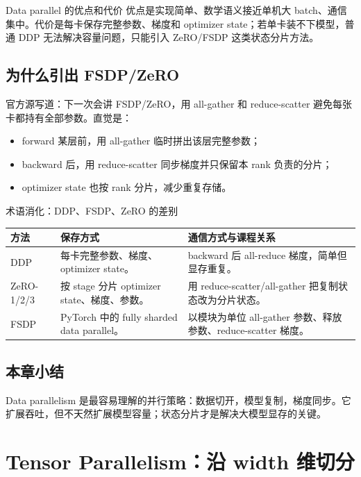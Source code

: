 \documentclass[a4paper]{article}
\begin{document}
\begin{importantbox}{Data parallel 的优点和代价}
优点是实现简单、数学语义接近单机大 batch、通信集中。代价是每卡保存完整参数、梯度和 optimizer state；若单卡装不下模型，普通 DDP 无法解决容量问题，只能引入 ZeRO/FSDP 这类状态分片方法。
\end{importantbox}

\subsection{为什么引出 FSDP/ZeRO}

官方源写道：下一次会讲 FSDP/ZeRO，用 all-gather 和 reduce-scatter 避免每张卡都持有全部参数。直觉是：

\begin{itemize}
    \item forward 某层前，用 all-gather 临时拼出该层完整参数；
    \item backward 后，用 reduce-scatter 同步梯度并只保留本 rank 负责的分片；
    \item optimizer state 也按 rank 分片，减少重复存储。
\end{itemize}

\begin{knowledgebox}{术语消化：DDP、FSDP、ZeRO 的差别}
\begin{tabular}{L{0.18\textwidth}L{0.32\textwidth}L{0.4\textwidth}}
\toprule
方法 & 保存方式 & 通信方式与课程关系 \\
\midrule
DDP & 每卡完整参数、梯度、optimizer state。 & backward 后 all-reduce 梯度，简单但显存重复。 \\
ZeRO-1/2/3 & 按 stage 分片 optimizer state、梯度、参数。 & 用 reduce-scatter/all-gather 把复制状态改为分片状态。 \\
FSDP & PyTorch 中的 fully sharded data parallel。 & 以模块为单位 all-gather 参数、释放参数、reduce-scatter 梯度。 \\
\bottomrule
\end{tabular}
\end{knowledgebox}

\subsection{本章小结}

Data parallelism 是最容易理解的并行策略：数据切开，模型复制，梯度同步。它扩展吞吐，但不天然扩展模型容量；状态分片才是解决大模型显存的关键。

\section{Tensor Parallelism：沿 width 维切分}
\end{document}

